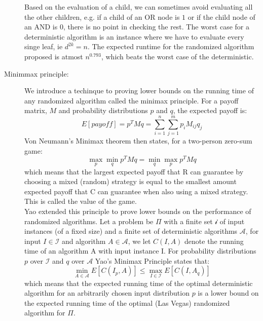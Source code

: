 \documentclass[a4paper]{article}
\begin{document}
\begin{description}
    Based on the evaluation of a child, we can sometimes avoid evaluating all the other children, e.g. if a child of an OR node is $1$ or if the child node of an AND is $0$, there is no point in checking the rest. The worst case for a deterministic algorithm is an instance where we have to evaluate every singe leaf, ie $d^{2k}=n$. The expected runtime for the randomized algorithm proposed is atmost $n^{0.793}$, which beats the worst case of the deterministic.
  \item[Minimmax principle:] We introduce a techinque to proving lower bounds on the running time of any randomized algorithm called the minimax principle. For a payoff matrix, $M$ and probability distributions $p$ and $q$, the expected payoff is:
    $$
    E[payoff] = p^TMq = \sum^{n}_{i=1} \sum^{m}_{j=1} p_iM_{ij}q_j
    $$
    Von Neumann's Minimax theorem then states, for a two-person zero-sum game:
    $$
    \max_p \min_q {p^TMq} = \min_q \max_p {p^TMq}
    $$
    which means that the largest expected payoff that R can guarantee by choosing a mixed (random) strategy is equal to the smallest amount expected payoff that C can guarantee when also using a mixed strategy. This is called the value of the game. \\
    Yao extended this principle to prove lower bounds on the performance of randomized algorithms. Let a problem be $\Pi$ with a finite set $\mathcal{i}$ of input instances (of a fixed size) and a finite set of deterministic algorithms $\mathcal{A}$, for input $I \in \mathcal{I}$ and algorithm $A\in \mathcal{A}$, we let $C(I,A)$ denote the running time of an algorithm A with input instance I. For probability distributions $p$ over $\mathcal{I}$ and $q$ over $\mathcal{A}$ Yao's  Minimax
    Principle states that:
    $$\min_{A\in \mathcal{A}}E[C(I_p, A)]\leq \max_{I\in \mathcal{I}}E[C(I, A_q)]$$
    which means that the expected running time of the optimal deterministic algorithm for an arbitrarily chosen input distribution $p$ is a lower bound on the     expected running time of the optimal (Las Vegas) randomized algorithm for $\Pi$.


\end{description}
\end{document}
